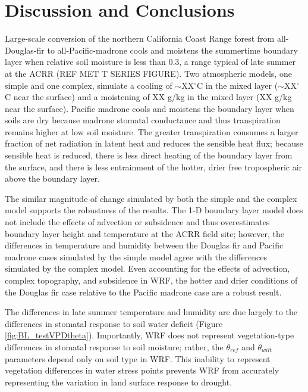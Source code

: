 \section{Discussion and Conclusions}

Large-scale conversion of the northern California Coast Range forest from all-Douglas-fir to all-Pacific-madrone cools and moistens the summertime boundary layer when relative soil moisture is less than 0.3, a range typical of late summer at the ACRR (REF MET T SERIES FIGURE).   Two atmospheric models, one simple and one complex, simulate a cooling of $\sim$XX$^\circ$C in the mixed layer ($\sim$XX$^\circ$C near the surface) and a moistening of XX g/kg in the mixed layer (XX g/kg near the surface).  Pacific madrone cools and moistens the boundary layer when soils are dry because madrone stomatal conductance and thus transpiration remains higher at low soil moisture.  The greater transpiration consumes a larger fraction of net radiation in latent heat and reduces the sensible heat flux; because sensible heat is reduced, there is less direct heating of the boundary layer from the surface, and there is less entrainment of the hotter, drier free tropospheric air above the boundary layer.

The similar magnitude of change simulated by both the simple and the complex model supports the robustness of the results.  The 1-D boundary layer model does not include the effects of advection or subsidence and thus overestimates boundary layer height and temperature at the ACRR field site; however, the differences in temperature and humidity between the Douglas fir and Pacific madrone cases simulated by the simple model agree with the differences simulated by the complex model.  Even accounting for the effects of advection, complex topography, and subsidence in WRF, the hotter and drier conditions of the Douglas fir case relative to the Pacific madrone case are a robust result.

The differences in late summer temperature and humidity are due largely to the differences in stomatal response to soil water deficit (Figure \ref{fig:BL_testVPDtheta}).  Importantly, WRF does not represent vegetation-type differences in stomatal response to soil moisture; rather, the $\theta_{ref}$ and $\theta_{wilt}$ parameters depend only on soil type in WRF.  This inability to represent vegetation differences in water stress points prevents WRF from accurately representing the variation in land surface response to drought.

